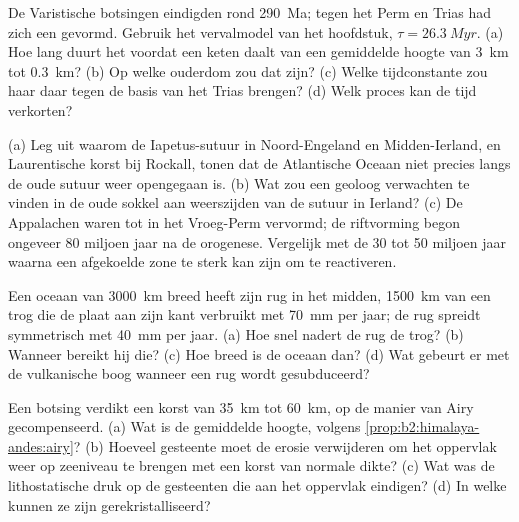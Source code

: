 \begin{exercise}[$\star\star$]\label{exo:b2:wilson-cycle:8}
De Varistische botsingen eindigden rond \qty{290}{Ma}; tegen het Perm en
Trias had zich een  gevormd. Gebruik het vervalmodel van het hoofdstuk, $\tau = \qty{26.3}{Myr}$. (a) Hoe lang duurt het voordat een
keten daalt van een gemiddelde hoogte van \qty{3}{km} tot \qty{0.3}{km}? (b) Op welke ouderdom zou
dat zijn? (c) Welke tijdconstante zou haar daar tegen de basis van het Trias brengen? (d) Welk
proces kan de tijd verkorten?
\end{exercise}

\begin{exercise}[$\star\star$]\label{exo:b2:wilson-cycle:9}
(a) Leg uit waarom de Iapetus-sutuur in Noord-Engeland en Midden-Ierland, en Laurentische
korst bij Rockall, tonen dat de Atlantische Oceaan niet precies langs de oude sutuur weer opengegaan is.
(b) Wat zou een geoloog verwachten te vinden in de oude sokkel aan weerszijden van de sutuur
in Ierland? (c) De Appalachen waren tot in het Vroeg-Perm vervormd; de riftvorming begon
ongeveer 80 miljoen jaar na de orogenese. Vergelijk met de 30 tot 50 miljoen jaar waarna
een afgekoelde zone te sterk kan zijn om te reactiveren.
\end{exercise}

\begin{exercise}[$\star\star\star$]\label{exo:b2:wilson-cycle:10}
Een oceaan van \qty{3000}{km} breed heeft zijn rug in het midden, \qty{1500}{km} van een trog die
de plaat aan zijn kant verbruikt met \qty{70}{mm} per jaar; de rug spreidt symmetrisch met \qty{40}{mm} per
jaar. (a) Hoe snel nadert de rug de trog? (b) Wanneer bereikt hij
die? (c) Hoe breed is de oceaan dan? (d) Wat gebeurt er met de vulkanische boog wanneer een rug
wordt gesubduceerd?
\end{exercise}

\begin{exercise}[$\star\star\star$]\label{exo:b2:wilson-cycle:11}
Een botsing verdikt een korst van \qty{35}{km} tot \qty{60}{km}, op de manier van Airy gecompenseerd.
(a) Wat is de gemiddelde hoogte, volgens \cref{prop:b2:himalaya-andes:airy}? (b) Hoeveel gesteente moet
de erosie verwijderen om het oppervlak weer op zeeniveau te brengen met een korst van normale dikte?
(c) Wat was de lithostatische druk op de gesteenten die aan het oppervlak eindigen? (d) In welke
 kunnen ze zijn gerekristalliseerd?
\end{exercise}

